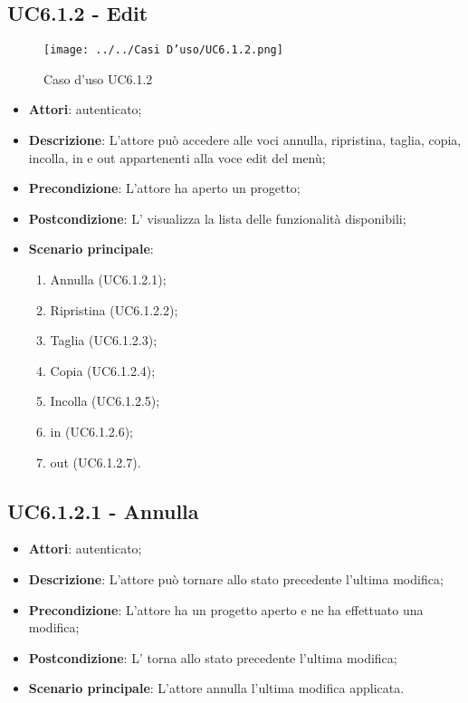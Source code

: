 \subsection{UC6.1.2 - Edit}
\label{ssec:UC6.1.2}
\begin{figure}[h!]
\centering
\texttt{[image: ../../Casi D'uso/UC6.1.2.png]}
\caption{Caso d'uso UC6.1.2}
 \end{figure}
\begin{itemize}
\item \textbf{Attori}:  autenticato;
\item \textbf{Descrizione}: L’attore può accedere alle voci annulla, ripristina, taglia, copia, incolla,  in e  out appartenenti alla voce edit del menù;
\item \textbf{Precondizione}: L'attore ha aperto un progetto;
\item \textbf{Postcondizione}: L’ visualizza la lista delle funzionalità disponibili;
\item \textbf{Scenario principale}: \begin{enumerate}\item Annulla (UC6.1.2.1);\item Ripristina (UC6.1.2.2);\item Taglia (UC6.1.2.3);\item Copia (UC6.1.2.4);\item Incolla (UC6.1.2.5);\item {} in (UC6.1.2.6);\item {} out (UC6.1.2.7).
 \end{enumerate}
\end{itemize}
\subsection{UC6.1.2.1 - Annulla}
\label{ssec:UC6.1.2.1}
\begin{itemize}
\item \textbf{Attori}:  autenticato;
\item \textbf{Descrizione}: L’attore può tornare allo stato precedente l’ultima modifica;
\item \textbf{Precondizione}: L'attore ha un progetto aperto e ne ha effettuato una modifica;
\item \textbf{Postcondizione}: L’ torna allo stato precedente l’ultima modifica;
\item \textbf{Scenario principale}: L'attore annulla l'ultima modifica applicata.
\end{itemize}
